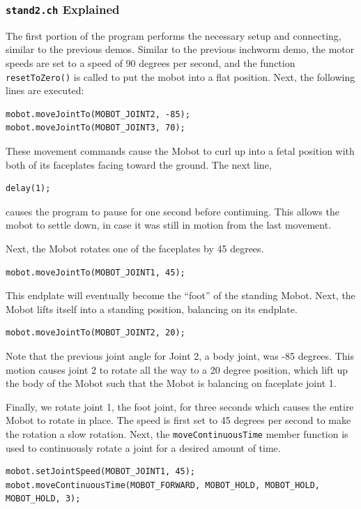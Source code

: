 \documentclass{article}
\begin{document}
\subsubsection{\texttt{stand2.ch} Explained}
The first portion of the program performs the necessary setup and connecting,
similar to the previous demos. Similar to the previous inchworm demo, the
motor speeds are set to a speed of 90 degrees per second, and the function \texttt{resetToZero()} is
called to put the mobot into a flat position. Next, the following lines
are executed:
\begin{verbatim}
mobot.moveJointTo(MOBOT_JOINT2, -85);
mobot.moveJointTo(MOBOT_JOINT3, 70);
\end{verbatim}
These movement commands cause the Mobot to curl up into a fetal position with
both of its faceplates facing toward the ground. The next line, 

\begin{verbatim}
delay(1);
\end{verbatim}
causes the program to pause for one second before continuing. This allows the
mobot to settle down, in case it was still in motion from the last movement.

Next, the Mobot rotates one 
of the faceplates by 45 degrees. 
\begin{verbatim}
mobot.moveJointTo(MOBOT_JOINT1, 45);
\end{verbatim}
This endplate will eventually become the ``foot'' of the standing Mobot. Next,
the Mobot lifts itself into a standing position, balancing on its endplate.
\begin{verbatim}
mobot.moveJointTo(MOBOT_JOINT2, 20);
\end{verbatim}
Note that the previous joint angle for Joint 2, a body joint, was -85 degrees. 
This motion causes joint 2 to rotate all the way to a 20 degree position, which
lift up the body of the Mobot such that the Mobot is balancing on faceplate joint 1.

Finally, we rotate joint 1, the foot joint, for three seconds which causes the
entire Mobot to rotate in place. The speed is first set to 45 degrees per second to make the
rotation a slow rotation. Next, the \texttt{moveContinuousTime} member function
is used to continuously rotate a joint for a desired amount of time.
\begin{verbatim}
mobot.setJointSpeed(MOBOT_JOINT1, 45);
mobot.moveContinuousTime(MOBOT_FORWARD, MOBOT_HOLD, MOBOT_HOLD, MOBOT_HOLD, 3);
\end{verbatim}
\end{document}
